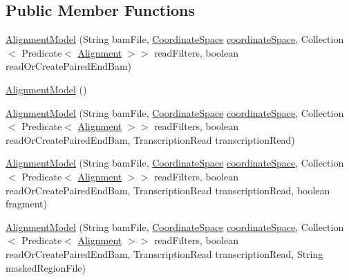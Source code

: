 \subsection*{Public Member Functions}
\begin{DoxyCompactItemize}
\item 
\hyperlink{classumms_1_1core_1_1model_1_1_alignment_model_a006824ec871887681edaffb89fa87162}{Alignment\+Model} (String bam\+File, \hyperlink{interfaceumms_1_1core_1_1coordinatesystem_1_1_coordinate_space}{Coordinate\+Space} \hyperlink{classumms_1_1core_1_1model_1_1_alignment_model_a39ef275175b500df6548f8ec18949dfe}{coordinate\+Space}, Collection$<$ Predicate$<$ \hyperlink{interfaceumms_1_1core_1_1alignment_1_1_alignment}{Alignment} $>$$>$ read\+Filters, boolean read\+Or\+Create\+Paired\+End\+Bam)
\item 
\hyperlink{classumms_1_1core_1_1model_1_1_alignment_model_a70581a60f336324d804867ffb73c7673}{Alignment\+Model} ()
\item 
\hyperlink{classumms_1_1core_1_1model_1_1_alignment_model_a3b8a700cc6b47bc3139d3bf2798c0bce}{Alignment\+Model} (String bam\+File, \hyperlink{interfaceumms_1_1core_1_1coordinatesystem_1_1_coordinate_space}{Coordinate\+Space} \hyperlink{classumms_1_1core_1_1model_1_1_alignment_model_a39ef275175b500df6548f8ec18949dfe}{coordinate\+Space}, Collection$<$ Predicate$<$ \hyperlink{interfaceumms_1_1core_1_1alignment_1_1_alignment}{Alignment} $>$$>$ read\+Filters, boolean read\+Or\+Create\+Paired\+End\+Bam, Transcription\+Read transcription\+Read)
\item 
\hyperlink{classumms_1_1core_1_1model_1_1_alignment_model_a542d2f0890ebfb72e65738c8d842a238}{Alignment\+Model} (String bam\+File, \hyperlink{interfaceumms_1_1core_1_1coordinatesystem_1_1_coordinate_space}{Coordinate\+Space} \hyperlink{classumms_1_1core_1_1model_1_1_alignment_model_a39ef275175b500df6548f8ec18949dfe}{coordinate\+Space}, Collection$<$ Predicate$<$ \hyperlink{interfaceumms_1_1core_1_1alignment_1_1_alignment}{Alignment} $>$$>$ read\+Filters, boolean read\+Or\+Create\+Paired\+End\+Bam, Transcription\+Read transcription\+Read, boolean fragment)
\item 
\hyperlink{classumms_1_1core_1_1model_1_1_alignment_model_a4fdc9fd5a446d0d1d005832175487121}{Alignment\+Model} (String bam\+File, \hyperlink{interfaceumms_1_1core_1_1coordinatesystem_1_1_coordinate_space}{Coordinate\+Space} \hyperlink{classumms_1_1core_1_1model_1_1_alignment_model_a39ef275175b500df6548f8ec18949dfe}{coordinate\+Space}, Collection$<$ Predicate$<$ \hyperlink{interfaceumms_1_1core_1_1alignment_1_1_alignment}{Alignment} $>$$>$ read\+Filters, boolean read\+Or\+Create\+Paired\+End\+Bam, Transcription\+Read transcription\+Read, String masked\+Region\+File)

\end{DoxyCompactItemize}
